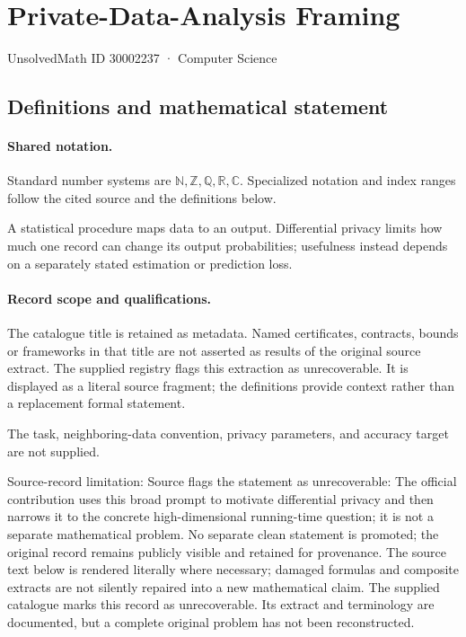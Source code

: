 \documentclass[11pt]{article}
\begin{document}
\setcounter{section}{30002236}
\section{Private-Data-Analysis Framing}\label{30002237}
{\small\sffamily UnsolvedMath ID 30002237 · Computer Science}
\subsection{Definitions and mathematical statement}

\paragraph{Shared notation.}Standard number systems are $\mathbb N,\mathbb Z,\mathbb Q,\mathbb R,\mathbb C$. Specialized notation and index ranges follow the cited source and the definitions below.


A statistical procedure maps data to an output. Differential privacy limits how much one record can change its output probabilities; usefulness instead depends on a separately stated estimation or prediction loss.
\paragraph{Record scope and qualifications.}
The catalogue title is retained as metadata. Named certificates, contracts, bounds or frameworks in that title are not asserted as results of the original source extract.
The supplied registry flags this extraction as unrecoverable. It is displayed as a literal source fragment; the definitions provide context rather than a replacement formal statement.

The task, neighboring-data convention, privacy parameters, and accuracy target are not supplied.

Source-record limitation: Source flags the statement as unrecoverable: The official contribution uses this broad prompt to motivate differential privacy and then narrows it to the concrete high-dimensional running-time question; it is not a separate mathematical problem. No separate clean statement is promoted; the original record remains publicly visible and retained for provenance.
The source text below is rendered literally where necessary; damaged formulas and composite extracts are not silently repaired into a new mathematical claim.
The supplied catalogue marks this record as unrecoverable. Its extract and terminology are documented, but a complete original problem has not been reconstructed.
\end{document}
